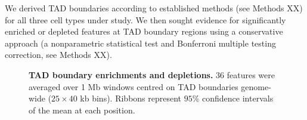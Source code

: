 \documentclass[a4paper,10pt,oneside]{book}
\begin{document}
We derived TAD boundaries according to established methods (see Methods XX) for all three cell types under study. We then sought evidence for significantly enriched or depleted features at TAD boundary regions using a conservative approach (a nonparametric statistical test and Bonferroni multiple testing correction, see Methods XX).

\begin{figure}
\begin{center} 
\captionsetup{width=1.2\textwidth}
\caption{ {\bf TAD boundary enrichments and depletions.}
36 features were averaged over 1 Mb windows centred on TAD boundaries genome-wide ($25 \times 40$ kb bins). Ribbons represent $95\%$ confidence intervals of the mean at each position.
}\label{fig:alltads}
\end{center}
\end{figure} 
\end{document}
